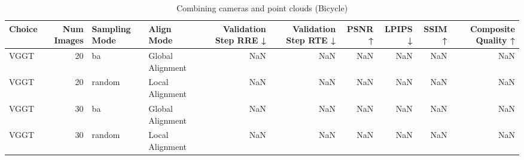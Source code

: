 \begin{table}[H]
\caption{Combining cameras and point clouds (Bicycle)}
\label{tab:11_combined_align_relaxed_bicycle}
\begin{tabular}{lrllrrrrrr}
\toprule
Choice & Num Images & Sampling Mode & Align Mode & Validation Step RRE ↓ & Validation Step RTE ↓ & PSNR ↑ & LPIPS ↓ & SSIM ↑ & Composite Quality ↑ \\
\midrule
VGGT & 20 & ba & Global Alignment & NaN & NaN & NaN & NaN & NaN & NaN \\
VGGT & 20 & random & Local Alignment & NaN & NaN & NaN & NaN & NaN & NaN \\
VGGT & 30 & ba & Global Alignment & NaN & NaN & NaN & NaN & NaN & NaN \\
VGGT & 30 & random & Local Alignment & NaN & NaN & NaN & NaN & NaN & NaN \\
\bottomrule
\end{tabular}
\end{table}
